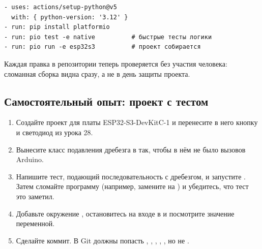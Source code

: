 \begin{Verbatim}[fontsize=\small,bgcolor=codebg]
- uses: actions/setup-python@v5
  with: { python-version: '3.12' }
- run: pip install platformio
- run: pio test -e native          # быстрые тесты логики
- run: pio run -e esp32s3          # проект собирается
\end{Verbatim}

Каждая правка в репозитории теперь проверяется без участия человека: сломанная сборка видна
сразу, а не в день защиты проекта.

\subsection{Самостоятельный опыт: проект с тестом}

\begin{enumerate}
  \item Создайте проект для платы ESP32-S3-DevKitC-1 и перенесите в него кнопку и светодиод из урока 28.
  \item Вынесите класс подавления дребезга в  так, чтобы в нём не было вызовов Arduino.
  \item Напишите тест, подающий последовательность с дребезгом, и запустите .
        Затем сломайте программу (например, замените \code{>=} на \code{<}) и убедитесь, что тест это заметил.
  \item Добавьте окружение , остановитесь на входе в  и посмотрите значение переменной.
  \item Сделайте коммит. В Git должны попасть , , , , ,
        но не .
\end{enumerate}

